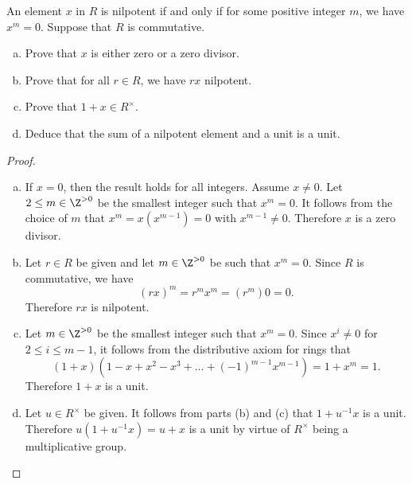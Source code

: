 \documentclass[10pt]{amsart}
\begin{document}
\begin{thm}
  An element $x$ in $R$ is nilpotent if and only if for some positive integer $m$, we have $x^m = 0$.
  Suppose that $R$ is commutative.
  \begin{enumerate}[(a)]
  \item
    Prove that $x$ is either zero or a zero divisor.
  \item
    Prove that for all $r \in R$, we have $rx$ nilpotent.
  \item
    Prove that $1 + x \in R^\times$.
  \item
    Deduce that the sum of a nilpotent element and a unit is a unit.
  \end{enumerate}
  \begin{proof}
    \begin{enumerate}[(a)]
    \item
      If $x = 0$, then the result holds for all integers.
      Assume $x \neq 0$.
      Let $2 \leq m \in \Z^{>0}$ be the smallest integer such that $x^m = 0$.
      It follows from the choice of $m$ that $x^m = x(x^{m-1}) = 0$ with $x^{m-1} \neq 0$.
      Therefore $x$ is a zero divisor.
    \item
      Let $r \in R$ be given and let $m \in \Z^{> 0}$ be such that $x^m = 0$.
      Since $R$ is commutative, we have 
      $$(rx)^m = r^mx^m = (r^m)0 = 0.$$
      Therefore $rx$ is nilpotent.
    \item
      Let $m \in \Z^{>0}$ be the smallest integer such that $x^m = 0$.
      Since $x^{i} \neq 0$ for $2 \leq i \leq m - 1$, it follows from the distributive axiom for rings that
      $$(1 + x)(1 - x + x^2 - x^3 + \ldots + (-1)^{m-1}x^{m-1}) = 1 + x^m = 1.$$
      Therefore $1+x$ is a unit.
    \item
      Let $u \in R^\times$ be given.
      It follows from parts (b) and (c) that $1 + u^{-1}x$ is a unit.
      Therefore $u(1 + u^{-1}x) = u + x$ is a unit by virtue of $R^\times$ being a multiplicative group.
    \end{enumerate}
  \end{proof}
\end{thm}
\end{document}
